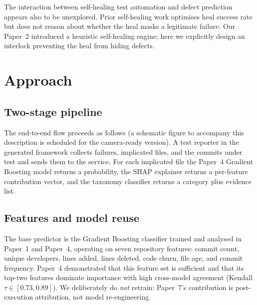 \documentclass[conference]{IEEEtran}
\begin{document}
The interaction between self-healing test automation and defect prediction appears also to be unexplored. Prior self-healing work optimises heal success rate but does not reason about whether the heal masks a legitimate failure. Our Paper~2 introduced a heuristic self-healing engine; here we explicitly design an interlock preventing the heal from hiding defects.

\section{Approach}
\label{sec:approach}

\subsection{Two-stage pipeline}

The end-to-end flow proceeds as follows (a schematic figure to accompany this description is scheduled for the camera-ready version). A test reporter in the generated framework collects failures, implicated files, and the commits under test and sends them to the service. For each implicated file the Paper~4 Gradient Boosting model returns a probability, the SHAP explainer returns a per-feature contribution vector, and the taxonomy classifier returns a category plus evidence list.


\subsection{Features and model reuse}

The base predictor is the Gradient Boosting classifier trained and analysed in Paper~1 and Paper~4, operating on seven repository features: commit count, unique developers, lines added, lines deleted, code churn, file age, and commit frequency. Paper~4 demonstrated that this feature set is sufficient and that its top-two features dominate importance with high cross-model agreement (Kendall $\tau \in [0.73, 0.89]$). We deliberately do \textit{not} retrain: Paper~7's contribution is post-execution attribution, not model re-engineering.
\end{document}
